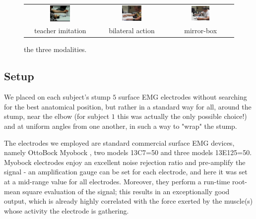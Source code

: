 \begin{figure}[!ht] \centering
  \begin{tabular}{ccc}
    \includegraphics[width=0.3\textwidth]{figs/mod1} &
    \includegraphics[width=0.3\textwidth]{figs/mod2} &
    \includegraphics[width=0.3\textwidth]{figs/mod3} \\
    teacher imitation & bilateral action & mirror-box \\
  \end{tabular}
  \caption{the three modalities.}
  \label{fig:modalities}
\end{figure}

\subsection{Setup}

We placed on each subject's stump $5$ surface EMG electrodes without
searching for the best anatomical position, but rather in a standard
way for all, around the stump, near the elbow (for subject $1$ this
was actually the only possible choice!) and at uniform angles from one
another, in such a way to "wrap" the stump.

The electrodes we employed are standard commercial surface EMG
devices, namely OttoBock Myobock \cite{ottobock}, two models 13C7=50
and three models 13E125=50. Myobock electrodes enjoy an excellent
noise rejection ratio and pre-amplify the signal - an amplification
gauge can be set for each electrode, and here it was set at a
mid-range value for all electrodes. Moreover, they perform a run-time
root-mean square evaluation of the signal; this results in an
exceptionally good output, which is already highly correlated with the
force exerted by the muscle(s) whose activity the electrode is
gathering.

